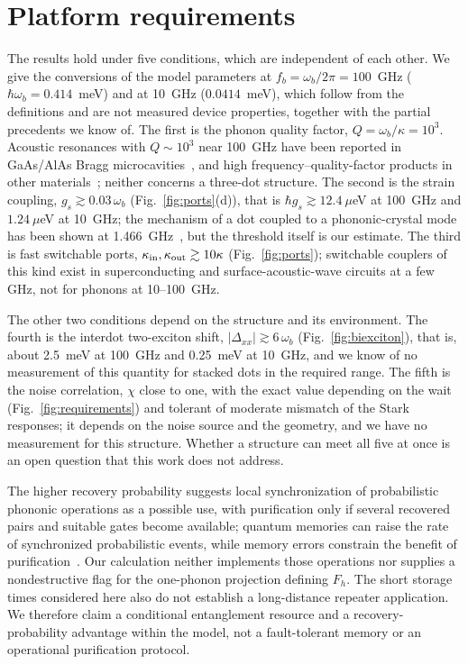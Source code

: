 \documentclass[aps,pra,preprint,groupedaddress,amsmath,amssymb,floatfix]{revtex4-2}
\begin{document}
\section{Platform requirements}
\label{sec:platform}

The results hold under five conditions, which are independent of each other. We give the conversions of the model parameters at $f_b=\omega_b/2\pi=100$~GHz ($\hbar\omega_b=0.414$~meV) and at 10~GHz ($0.0414$~meV), which follow from the definitions and are not measured device properties, together with the partial precedents we know of. The first is the phonon quality factor, $Q=\omega_b/\kappa=10^3$. Acoustic resonances with $Q\sim10^3$ near 100~GHz have been reported in GaAs/AlAs Bragg microcavities~\cite{czerniuk2014}, and high frequency--quality-factor products in other materials~\cite{zalalutdinov2021}; neither concerns a three-dot structure. The second is the strain coupling, $g_s\gtrsim0.03\,\omega_b$ (Fig.~\ref{fig:ports}(d)), that is $\hbar g_s\gtrsim12.4~\mu$eV at 100~GHz and $1.24~\mu$eV at 10~GHz; the mechanism of a dot coupled to a phononic-crystal mode has been shown at 1.466~GHz~\cite{spinnler2024}, but the threshold itself is our estimate. The third is fast switchable ports, $\kappa_{\rm in},\kappa_{\rm out}\gtrsim10\kappa$ (Fig.~\ref{fig:ports}); switchable couplers of this kind exist in superconducting and surface-acoustic-wave circuits at a few GHz, not for phonons at 10--100~GHz.

The other two conditions depend on the structure and its environment. The fourth is the interdot two-exciton shift, $|\Delta_{xx}|\gtrsim6\,\omega_b$ (Fig.~\ref{fig:biexciton}), that is, about 2.5~meV at 100~GHz and 0.25~meV at 10~GHz, and we know of no measurement of this quantity for stacked dots in the required range. The fifth is the noise correlation, $\chi$ close to one, with the exact value depending on the wait (Fig.~\ref{fig:requirements}) and tolerant of moderate mismatch of the Stark responses; it depends on the noise source and the geometry, and we have no measurement for this structure. Whether a structure can meet all five at once is an open question that this work does not address.

The higher recovery probability suggests local synchronization of probabilistic phononic operations as a possible use, with purification only if several recovered pairs and suitable gates become available; quantum memories can raise the rate of synchronized probabilistic events, while memory errors constrain the benefit of purification~\cite{nunn2013,briegel1998,razavi2009}. Our calculation neither implements those operations nor supplies a nondestructive flag for the one-phonon projection defining $F_h$. The short storage times considered here also do not establish a long-distance repeater application. We therefore claim a conditional entanglement resource and a recovery-probability advantage within the model, not a fault-tolerant memory or an operational purification protocol.
\end{document}
